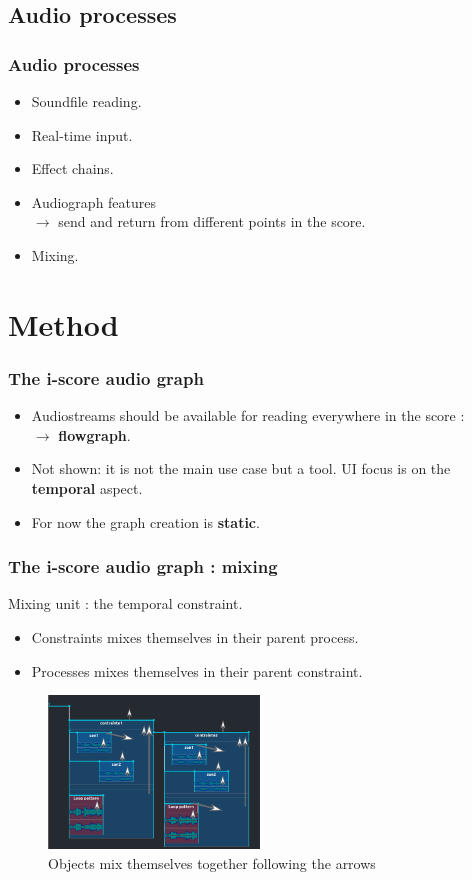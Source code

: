 \documentclass{beamer}
\begin{document}
\subsection{Audio processes}
\begin{frame}	
    \frametitle{Audio processes}    
    \LARGE
    \begin{itemize}
        \item Soundfile reading.
        \item Real-time input.
        \item Effect chains.
        \item Audiograph features~\\$\rightarrow$ send and return from different points in the score.
        \item Mixing.
    \end{itemize}    
\end{frame}

\section{Method}
\begin{frame}
    \frametitle{The i-score audio graph}    
    \Large
    \begin{itemize}
        \item Audiostreams should be available for reading everywhere in the score : \\ $\rightarrow$ \textbf{flowgraph}.
        \item Not shown: it is not the main use case but a tool. UI focus is on the \textbf{temporal} aspect.
        \item For now the graph creation is \textbf{static}.
    \end{itemize}    
\end{frame}

\begin{frame}
    \frametitle{The i-score audio graph : mixing}    
	\Large
	
    Mixing unit : the temporal constraint.
    
    \begin{itemize}
        \item Constraints mixes themselves in their parent process.
        \item Processes mixes themselves in their parent constraint.
    \end{itemize}
    
	\begin{figure}
		\centering
		\includegraphics[width=0.5\textwidth]{images/mixage.png}
		\caption{Objects mix themselves together following the arrows}
	\end{figure}
\end{frame}
\end{document}
